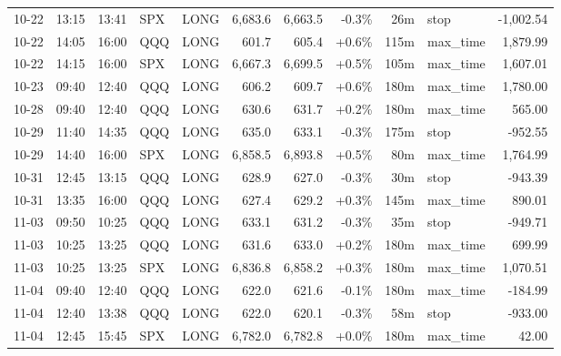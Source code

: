 \documentclass[11pt,a4paper,twoside]{article}
\begin{document}
\begin{center}
\begin{longtable}{>{\color{txtmain}}l l l l l r r r r >{\color{txtmain}}l r}
10-22 & 13:15 & 13:41 & SPX & LONG & 6,683.6 & 6,663.5 & \textcolor{lossred}{-0.3\%} & 26m & stop & \textcolor{lossred}{-1,002.54} \\
10-22 & 14:05 & 16:00 & QQQ & LONG & 601.7 & 605.4 & \textcolor{wingreen}{+0.6\%} & 115m & max\_time & \textcolor{wingreen}{1,879.99} \\
10-22 & 14:15 & 16:00 & SPX & LONG & 6,667.3 & 6,699.5 & \textcolor{wingreen}{+0.5\%} & 105m & max\_time & \textcolor{wingreen}{1,607.01} \\
10-23 & 09:40 & 12:40 & QQQ & LONG & 606.2 & 609.7 & \textcolor{wingreen}{+0.6\%} & 180m & max\_time & \textcolor{wingreen}{1,780.00} \\
10-28 & 09:40 & 12:40 & QQQ & LONG & 630.6 & 631.7 & \textcolor{wingreen}{+0.2\%} & 180m & max\_time & \textcolor{wingreen}{565.00} \\
10-29 & 11:40 & 14:35 & QQQ & LONG & 635.0 & 633.1 & \textcolor{lossred}{-0.3\%} & 175m & stop & \textcolor{lossred}{-952.55} \\
10-29 & 14:40 & 16:00 & SPX & LONG & 6,858.5 & 6,893.8 & \textcolor{wingreen}{+0.5\%} & 80m & max\_time & \textcolor{wingreen}{1,764.99} \\
10-31 & 12:45 & 13:15 & QQQ & LONG & 628.9 & 627.0 & \textcolor{lossred}{-0.3\%} & 30m & stop & \textcolor{lossred}{-943.39} \\
10-31 & 13:35 & 16:00 & QQQ & LONG & 627.4 & 629.2 & \textcolor{wingreen}{+0.3\%} & 145m & max\_time & \textcolor{wingreen}{890.01} \\
11-03 & 09:50 & 10:25 & QQQ & LONG & 633.1 & 631.2 & \textcolor{lossred}{-0.3\%} & 35m & stop & \textcolor{lossred}{-949.71} \\
11-03 & 10:25 & 13:25 & QQQ & LONG & 631.6 & 633.0 & \textcolor{wingreen}{+0.2\%} & 180m & max\_time & \textcolor{wingreen}{699.99} \\
11-03 & 10:25 & 13:25 & SPX & LONG & 6,836.8 & 6,858.2 & \textcolor{wingreen}{+0.3\%} & 180m & max\_time & \textcolor{wingreen}{1,070.51} \\
11-04 & 09:40 & 12:40 & QQQ & LONG & 622.0 & 621.6 & \textcolor{lossred}{-0.1\%} & 180m & max\_time & \textcolor{lossred}{-184.99} \\
11-04 & 12:40 & 13:38 & QQQ & LONG & 622.0 & 620.1 & \textcolor{lossred}{-0.3\%} & 58m & stop & \textcolor{lossred}{-933.00} \\
11-04 & 12:45 & 15:45 & SPX & LONG & 6,782.0 & 6,782.8 & \textcolor{wingreen}{+0.0\%} & 180m & max\_time & \textcolor{wingreen}{42.00} \\

\end{longtable}
\end{center}
\end{document}
